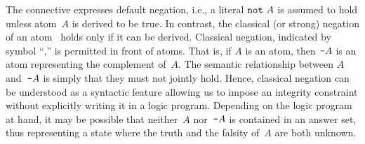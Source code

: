 The connective  expresses default negation,
i.e., a literal $\texttt{not}~A$ is assumed to hold unless atom~$A$ is derived to be true.
In contrast, the classical (or strong) negation of an atom~\cite{gellif91a} %
holds only if %
it can be derived.
Classical negation, indicated by symbol ``\code{-},'' is permitted in front of atoms.
That is, if $A$ is an atom, then $\texttt{-}A$ is 
an atom representing the complement of~$A$.
The semantic relationship between $A$ and~$\texttt{-}A$
is simply that they 
must not jointly hold.
Hence,
classical negation can be understood as a syntactic feature
allowing us to impose an integrity constraint 
without explicitly writing it in a logic program.
Depending on the logic program at hand,
it may be possible that neither~$A$ nor~$\texttt{-}A$ is contained in an answer set,
thus representing a state where the truth and the falsity of~$A$ are both unknown.


